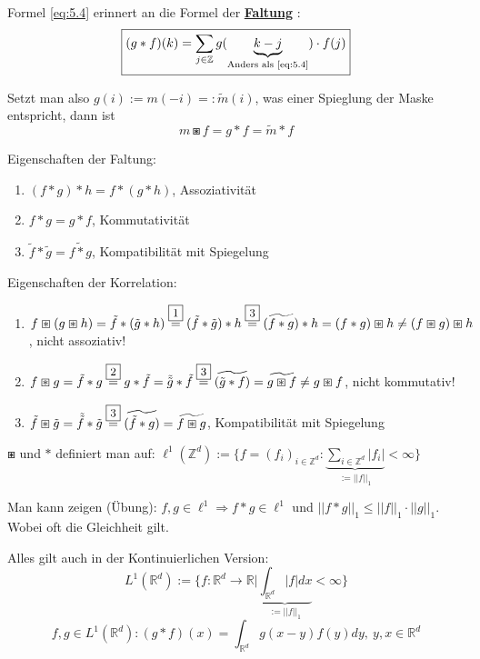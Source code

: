 \documentclass{article}
\theoremstyle{plain}
\theoremstyle{definition}
\numberwithin{equation}{section}
\newcommand{\norm}[1] {
\left|\left| #1 \right|\right|
}
\newcommand{\abs}[1] {
\left| #1 \right|
}
\newcommand{\R}[0] {
\mathbb R
}
\newcommand{\Z}[0] {
    \mathbb Z
}
\newcommand{\mim}[1] {
\underline{\textbf{#1\index{#1}}}
}
\newcommand{\C}[0]{
    \cdot
}
\begin{document}
        Formel \eqref{eq:5.4} erinnert an die Formel der \mim{Faltung}:
        \begin{equation}\label{eq:5.5}
            \framebox{$\displaystyle (g * f)(k) = \sum_{j \in \Z} g(\underbrace{k-j}_{\text{Anders als \eqref{eq:5.4}}}) \cdot f(j)$}
        \end{equation}

        Setzt man also $g(i) := m(-i) =: \tilde m(i)$, was einer Spieglung der Maske entspricht, dann ist
        \[m \boxast f = g * f = \tilde m * f\]

        Eigenschaften der Faltung:
        \begin{enumerate}[label=\framebox{\arabic *}]
            \item $(f * g) * h = f * (g* h)$, Assoziativität
            \item $f*g=g*f$, Kommutativität
            \item $\tilde f * \tilde g = \widetilde{f * g}$, Kompatibilität mit Spiegelung
        \end{enumerate}
        Eigenschaften der Korrelation:
        \begin{enumerate}[label=\framebox{\arabic *'}]
            \item $f \boxast (g \boxast h) = \tilde f * ( \tilde g* h) \overset{\framebox{\small 1}}{=} ( \tilde f * \tilde g) * h \overset{\framebox{\small 3}}{=} (\widetilde{f * g}) * h = (f * g) \boxast h \neq (f \boxast g) \boxast h$, nicht assoziativ!
            \item $f \boxast g = \tilde f * g \overset{\framebox{\small 2}}{=} g * \tilde f = \tilde{\tilde g} * \tilde f \overset{\framebox{\small 3}}{=} \widetilde{(\tilde g * f)} = \widetilde{g \boxast f} \neq g \boxast f$, nicht kommutativ!
            \item $\tilde f \boxast \tilde g = \tilde{\tilde f} * \tilde g \overset{\framebox{\small 3}}{=} \widetilde{(\tilde f * g)} = \widetilde{f \boxast g}$, Kompatibilität mit Spiegelung
        \end{enumerate}

	$\boxast$ und $*$ definiert man auf: $\ell^1(\Z^d):=\{f=(f_i)_{i \in \Z^d} : \underbrace{\sum_{i \in \Z^d}\abs{f_i}}_{:=\norm{f}_1} < \infty\}$

	Man kann zeigen (Übung): $f,g \in \ell^1 \Rightarrow f * g \in \ell^1$ und $\norm{f * g}_1 \leq \norm{f}_1 \C \norm{g}_1$.
    Wobei oft die Gleichheit gilt.

    Alles gilt auch in der Kontinuierlichen Version:
    \[L^1(\R^d) := \{f:\R^d \to \R | \underbrace{\int_{\R^d}\abs{f} dx}_{:=\norm{f}_1} < \infty\}\]
    \[f,g \in L^1(\R^d): (g*f)(x)=\int_{\R^d}g(x-y)f(y) dy, \ y,x \in \R^d\]
\end{document}
